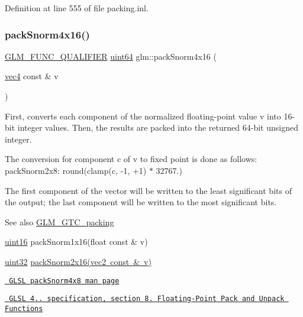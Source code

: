 Definition at line 555 of file packing.\+inl.

\mbox{\label{group__gtc__packing_ga9b237d7c66b7a71964e6d1f4dc06539f}} 
\subsubsection{\texorpdfstring{packSnorm4x16()}{packSnorm4x16()}}
{\footnotesize\ttfamily \mbox{\hyperlink{setup_8hpp_a33fdea6f91c5f834105f7415e2a64407}{G\+L\+M\+\_\+\+F\+U\+N\+C\+\_\+\+Q\+U\+A\+L\+I\+F\+I\+ER}} \mbox{\hyperlink{group__gtc__type__precision_gae3632bf9b37da66233d78930dd06378a}{uint64}} glm\+::pack\+Snorm4x16 (\begin{DoxyParamCaption}\item[{\mbox{\hyperlink{group__core__types_ga5881b1b022d7fd1b7218f5916532dd02}{vec4}} const \&}]{v }\end{DoxyParamCaption})}

First, converts each component of the normalized floating-\/point value v into 16-\/bit integer values. Then, the results are packed into the returned 64-\/bit unsigned integer.

The conversion for component c of v to fixed point is done as follows\+: pack\+Snorm2x8\+: round(clamp(c, -\/1, +1) $\ast$ 32767.)

The first component of the vector will be written to the least significant bits of the output; the last component will be written to the most significant bits.

\begin{DoxySeeAlso}{See also}
\mbox{\hyperlink{group__gtc__packing}{G\+L\+M\+\_\+\+G\+T\+C\+\_\+packing}} 

\mbox{\hyperlink{group__gtc__type__precision_gad8c2939e1fdd8e5828b31d95c52255d5}{uint16}} pack\+Snorm1x16(float const \& v) 

\mbox{\hyperlink{group__gtc__type__precision_ga202b6a53c105fcb7e531f9b443518451}{uint32}} \mbox{\hyperlink{group__core__func__packing_ga0c8005de240d6c4ca3d16c7bee25c622}{pack\+Snorm2x16(vec2 const \& v)}} 

\href{http://www.opengl.org/sdk/docs/manglsl/xhtml/packSnorm4x8.xml}{\texttt{ G\+L\+SL pack\+Snorm4x8 man page}} 

\href{http://www.opengl.org/registry/doc/GLSLangSpec.4.20.8.pdf}{\texttt{ G\+L\+SL 4.. specification, section 8. Floating-\/\+Point Pack and Unpack Functions}} 
\end{DoxySeeAlso}


